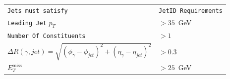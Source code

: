 \documentclass{beamer}
\begin{document}
\begin{frame}
\begin{minipage}[b]{0.45\linewidth}
{\begin{tabular}[2cm]{l l}
  \hline 
  \hline
 \texttt{Jets must satisfy} & \texttt{JetID Requirements} \\
 \texttt{Leading Jet} $p_{T}$ & $ > 35$~GeV \\
 \texttt{Number Of Constituents} & $ > 1$ \\
 $\Delta R(\gamma, jet) = \sqrt{(\phi_{\gamma}-\phi_{jet})^{2} + (\eta_{\gamma}-\eta_{jet})^{2}}$ & $ > 0.3$ \\
\hline \hline
 $E^{\mbox{miss}}_{T}$&  $> 25$~GeV \\
 \hline
\end{tabular}
}
\end{minipage}


\end{frame}
\end{document}
